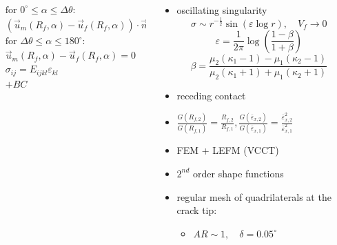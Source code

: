 \documentclass[first,firstsupp,lastsupp,last,hyperref,table]{ETHclass}
\begin{document}
\begin{frame}
\begin{columns}
\begin{column}{0.6\textwidth}
\begin{columns}
\begin{column}{0.675\columnwidth}
\begin{equation*}
\begin{aligned}
&\text{for } 0^{\circ}\leq\alpha\leq\Delta\theta:\\
&\left(\overrightarrow{u}_{m}\left(R_{f},\alpha\right)-\overrightarrow{u}_{f}\left(R_{f},\alpha\right)\right)\cdot\overrightarrow{n}_{\alpha}\geq 0\\
&\text{for } \Delta\theta\leq\alpha\leq 180^{\circ}:\\
&\overrightarrow{u}_{m}\left(R_{f},\alpha\right)-\overrightarrow{u}_{f}\left(R_{f},\alpha\right)=0\\
&\sigma_{ij}=E_{ijkl}\varepsilon_{kl}\\
&+BC
\end{aligned}
\end{equation*}
\end{column}
\end{columns}
\end{column}
\begin{column}{0.375\textwidth}
\scriptsize
\begin{itemize}[label=]
\item oscillating singularity
\vspace{-0.25cm}
\begin{equation*}
\sigma\sim r^{-\frac{1}{2}}\sin\left(\varepsilon\log r\right),\quad V_{f}\rightarrow 0
\end{equation*}
{\tiny
\begin{equation*}
\varepsilon=\frac{1}{2\pi}\log\left(\frac{1-\beta}{1+\beta}\right)
\end{equation*}
\begin{equation*}
\beta=\frac{\mu_{2}\left(\kappa_{1}-1\right)-\mu_{1}\left(\kappa_{2}-1\right)}{\mu_{2}\left(\kappa_{1}+1\right)+\mu_{1}\left(\kappa_{2}+1\right)}
\end{equation*}}
\item receding contact
\item $\frac{G\left(R_{f,2}\right)}{G\left(R_{f,1}\right)}=\frac{R_{f,2}}{R_{f,1}},\frac{G\left(\bar{\varepsilon}_{x,2}\right)}{G\left(\bar{\varepsilon}_{x,1}\right)}=\frac{\bar{\varepsilon}^{2}_{x,2}}{\bar{\varepsilon}^{2}_{x,1}}$
\item FEM + LEFM (VCCT)
\item $2^{nd}$ order shape functions
\item regular mesh of quadrilaterals at the crack tip:
\begin{itemize}[label=-]
\item $AR\sim 1,\quad\delta=0.05^{\circ}$
\end{itemize}
\end{itemize}
\end{column}
\end{columns}
\end{frame}
\end{document}
